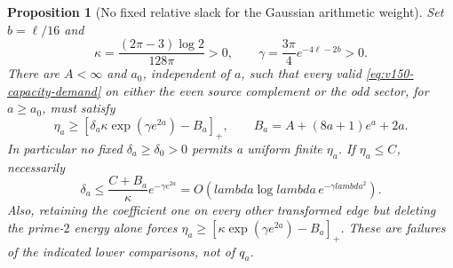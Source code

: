 \documentclass[11pt]{article}
\def\lambda{lambda}%
\newtheorem{proposition}[theorem]{Proposition}
\theoremstyle{remark}
\begin{document}
\begin{proposition}[No fixed relative slack for the Gaussian arithmetic weight]
\label{prop:v150-capacity-slack}
Set $b=\ell/16$ and
\[
 \kappa=\frac{(2\pi-3)\log2}{128\pi}>0,\qquad
 \gamma=\frac{3\pi}{4}e^{-4\ell-2b}>0.
\]
There are $A<\infty$ and $a_0$, independent of $a$, such that every
valid \eqref{eq:v150-capacity-demand} on either the even source
complement or the odd sector, for $a\ge a_0$, must satisfy
\begin{equation}\label{eq:v150-slack-budget}
 \eta_a\ge\left[\delta_a\kappa\exp(\gamma e^{2a})-B_a\right]_+,
 \qquad B_a=A+(8a+1)e^a+2a.
\end{equation}
In particular no fixed $\delta_a\ge\delta_0>0$ permits a uniform
finite $\eta_a$. If $\eta_a\le C$, necessarily
\begin{equation}\label{eq:v150-slack-rate}
 \delta_a\le\frac{C+B_a}{\kappa}e^{-\gamma e^{2a}}
       =O(\lambda\log\lambda\,e^{-\gamma\lambda^2}).
\end{equation}
Also, retaining the coefficient one on every other transformed edge
but deleting the prime-$2$ energy alone forces
$\eta_a\ge[\kappa\exp(\gamma e^{2a})-B_a]_+$.
These are failures of the indicated lower comparisons, not of $q_a$.
\end{proposition}
\end{document}
